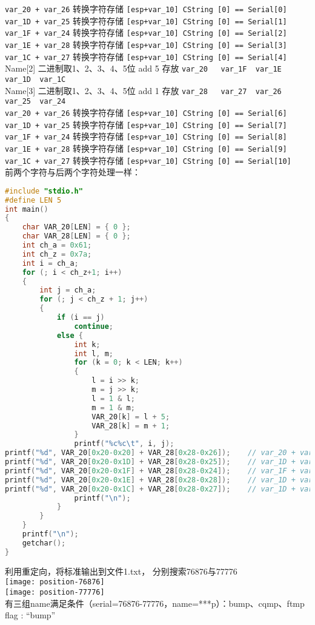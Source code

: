 \begin{enumerate}
\lstinline$var_20 + var_26$	转换字符存储	\lstinline$[esp+var_10] CString	[0] == Serial[0]$\\
\lstinline$var_1D + var_25$	转换字符存储	\lstinline$[esp+var_10] CString	[0] == Serial[1]$\\
\lstinline$var_1F + var_24$	转换字符存储	\lstinline$[esp+var_10] CString	[0] == Serial[2]$\\
\lstinline$var_1E + var_28$	转换字符存储	\lstinline$[esp+var_10] CString	[0] == Serial[3]$\\
\lstinline$var_1C + var_27$	转换字符存储	\lstinline$[esp+var_10] CString	[0] == Serial[4]$\\



Name[2]		二进制取1、2、3、4、5位 add 5 存放	\lstinline$var_20	var_1F	var_1E	var_1D	var_1C$\\
Name[3]		二进制取1、2、3、4、5位 add 1 存放	\lstinline$var_28	var_27	var_26	var_25	var_24$\\

\lstinline$var_20 + var_26$	转换字符存储	\lstinline$[esp+var_10] CString	[0] == Serial[6]$\\
\lstinline$var_1D + var_25$	转换字符存储	\lstinline$[esp+var_10] CString	[0] == Serial[7]$\\
\lstinline$var_1F + var_24$	转换字符存储	\lstinline$[esp+var_10] CString	[0] == Serial[8]$\\
\lstinline$var_1E + var_28$	转换字符存储	\lstinline$[esp+var_10] CString	[0] == Serial[9]$\\
\lstinline$var_1C + var_27$	转换字符存储	\lstinline$[esp+var_10] CString	[0] == Serial[10]$\\
	前两个字符与后两个字符处理一样：\\
	\begin{lstlisting}[language=C]
#include "stdio.h"
#define LEN 5
int main()
{
	char VAR_20[LEN] = { 0 };
	char VAR_28[LEN] = { 0 };
	int ch_a = 0x61;
	int ch_z = 0x7a;
	int i = ch_a;
	for (; i < ch_z+1; i++)
	{
		int j = ch_a;
		for (; j < ch_z + 1; j++)
		{
			if (i == j)
				continue;
			else {
				int k;
				int l, m;
				for (k = 0; k < LEN; k++)
				{
					l = i >> k;
					m = j >> k;
					l = 1 & l;
					m = 1 & m;
					VAR_20[k] = l + 5;
					VAR_28[k] = m + 1;
				}
				printf("%c%c\t", i, j);
printf("%d", VAR_20[0x20-0x20] + VAR_28[0x28-0x26]);	// var_20 + var_26
printf("%d", VAR_20[0x20-0x1D] + VAR_28[0x28-0x25]);	// var_1D + var_25
printf("%d", VAR_20[0x20-0x1F] + VAR_28[0x28-0x24]);	// var_1F + var_24
printf("%d", VAR_20[0x20-0x1E] + VAR_28[0x28-0x28]);	// var_1D + var_28
printf("%d", VAR_20[0x20-0x1C] + VAR_28[0x28-0x27]);	// var_1D + var_27
				printf("\n");
			}
		}
	}
	printf("\n");
	getchar();
}
	\end{lstlisting}
	利用重定向，将标准输出到文件1.txt， 分别搜索76876与77776\\
	\texttt{[image: position-76876]} \\
	\texttt{[image: position-77776]} \\
	有三组name满足条件（serial=76876-77776，name=***p）：bump、cqmp、ftmp \\
	flag : ``bump''
\end{enumerate}